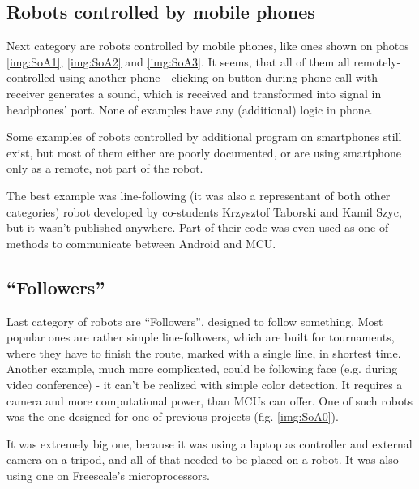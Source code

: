 \subsection{Robots controlled by mobile phones}
Next category are robots controlled by mobile phones, like ones shown on photos
\ref{img:SoA1}, \ref{img:SoA2} and \ref{img:SoA3}.
It seems, that all of them all remotely-controlled using another phone -
clicking on button during phone call with receiver generates a sound, which is received and transformed into
signal in headphones' port.
None of examples have any (additional) logic in phone. 

Some examples of robots controlled by additional program on smartphones
still exist, but most of them either are poorly documented, or are using
smartphone only as a remote, not part of the robot. 

The best example was line-following (it was also a representant of both other
categories) robot developed by co-students Krzysztof Taborski and Kamil Szyc,
but it wasn't published anywhere.
Part of their code was even used as one of methods to communicate between
Android and MCU.


\clearpage

\subsection{``Followers''}
Last category of robots are ``Followers'', designed to follow something.
Most popular ones are rather simple line-followers, which are built for
tournaments, where they have to finish the route, marked with a single line, in
shortest time.
Another example, much more complicated, could be following face (e.g. during
video conference) - it can't be realized with simple color detection. 
It requires a camera and more computational power, than MCUs can offer.
One of such robots was the one designed for one of previous projects (fig.
\ref{img:SoA0}). 

It was extremely big one, because it was using a laptop as controller
and external camera on a tripod, and all of that needed to be placed on a robot.
It was also using one on Freescale's microprocessors.

